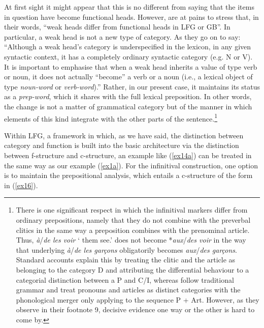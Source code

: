 \documentclass[output=paper]{langsci/langscibook}
\begin{document}
At first sight it might appear that this is no different from saying that the
items in question have become functional heads. However, \cite[note
12]{Abeilleetal06} are at pains to stress that, in their words, \enquote{weak heads
differ from functional heads in \gls{LFG} or GB}. In particular, a weak head is not a new type of
category. As they go on to say: ``Although a weak head's category is
underspecified in the lexicon, in any given syntactic context, it has a
completely ordinary syntactic category (e.g. N or V).
It is important to emphasise that when a weak head inherits a value of type
verb or noun, it does not actually ``become'' a verb or a noun (i.e., a lexical
object of type \emph{noun-word} or \emph{verb-word}).'' Rather, in our present
case, it maintains its status as a \emph{prep-word}, which it shares with the
full lexical preposition. In other words, the change is not a matter of
grammatical category but of the manner in which elements of this kind integrate
with the other parts of the sentence.\footnote{There is one significant respect
    in which the infinitival markers differ from ordinary prepositions, namely
    that they do not combine with the preverbal clitics in the same
    way a preposition combines with the prenominal article. Thus,
    \emph{\`a}/\emph{de les voir} `\Comp{} them see.\Inf{}' does not become
    *\emph{aux}/\emph{des voir} in the way that underlying \emph{\`a}/\emph{de
    les gar\c{c}ons} obligatorily becomes \emph{aux}/\emph{des gar\c{c}ons}.
    Standard accounts explain this by treating the clitic and the article as
    belonging to the category D and attributing the differential behaviour to a
    categorial distinction between a P and C/I, whereas
    \citeauthor{Abeilleetal06}  follow traditional grammar and treat pronouns
    and articles as distinct categories with the phonological merger only
applying to the sequence P + Art. However, as they observe in their footnote 9,
decisive evidence one way or the other is hard to come by.}\largerpage

Within \gls{LFG}, a framework in which, as we have said, the distinction
between category and function is built into the basic architecture via the
distinction be\-tween f-structure and c-structure, an example like (\ref{ex14a})
can be treated in the same way as our  example (\ref{ex1a}). For the
infinitival construction, one option is to maintain the prepositional analysis,
which entails a c-structure of the form in (\ref{ex16}).
\end{document}
